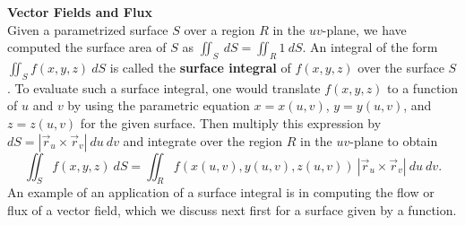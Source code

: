 \noindent\textbf{\large Vector Fields and Flux}\\

Given a parametrized surface $S$ over a region $R$ in the $uv$-plane, we have computed the surface area of $S$ as $\iint_S \: dS = \iint_R 1 \: dS$.  An integral of the form $\iint_S f(x,y,z) \: dS$ is called the \textbf{surface integral} of $f(x,y,z)$ over the surface $S$. To evaluate such a surface integral, one would translate $f(x,y,z)$ to a function of $u$ and $v$ by using the parametric equation $x = x(u,v)$, $y = y(u,v)$, and $z = z(u,v)$ for the given surface.  Then multiply this expression by $dS = \left| \vec r_u \times \vec r_v \right| \: du \: dv$ and integrate over the region $R$ in the $uv$-plane to obtain
$$\iint_S f(x,y,z) \: dS = \iint_R f(x(u,v), y(u,v), z(u,v)) \: \left| \vec r_u \times \vec r_v \right| \: du \: dv.$$
An example of an application of a surface integral is in computing the flow or flux of a vector field, which we discuss next first for a surface given by a function.\\




